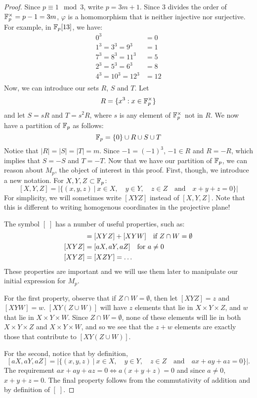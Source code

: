 \begin{proof}
Since $p \equiv 1 \mod{3}$, write $p = 3m + 1$.
Since 3 divides the order of $\mathbb{F}_{p}^{\times} = p-1 = 3m$, $\varphi$ is a homomorphism that is neither injective nor surjective.
For example, in $\mathbb{F}_p[13]$, we have:
\begin{align*}
	0^3 &= 0\\
	1^3 = 3^3 = 9^3 &= 1\\
	7^3 = 8^3 = 11^3 &= 5\\
	2^3 = 5^3 = 6^3 &= 8\\
	4^3 = 10^3 = 12^3 &= 12\\
\end{align*}
Now, we can introduce our sets $R$, $S$ and $T$.
Let
$$R=\{x^3:x\in \mathbb{F}_{p}^{\times}\}$$
and let $S = sR$ and $T = s^2R$, where $s$ is any element of $\mathbb{F}_{p}^{\times}$ not in $R$.
We now have a partition of $\mathbb{F}_p$ as follows:
$$\mathbb{F}_p = \{0\} \cup R \cup S \cup T$$
Notice that $|R| = |S| = |T| = m$.
Since $-1=(-1)^3$, $-1 \in R$ and $R = -R$, which implies that $S=-S$ and $T=-T$.
Now that we have our partition of $\mathbb{F}_p$, we can reason about $M_p$, the object of interest in this proof.
First, though, we introduce a new notation.
For $X,Y,Z \subset \mathbb{F}_p$:
$$[X,Y,Z] = |\{(x,y,z)\ |\ x\in X,\quad y\in Y,\quad z\in Z\quad \text{and} \quad x+y+z=0\}|$$
For simplicity, we will sometimes write $[XYZ]$ instead of $[X,Y,Z]$.
Note that this is different to writing homogenous coordinates in the projective plane!

The symbol $[\;]$ has a number of useful properties, such as:
\begin{align*}
	[XY(Z\cup W)] &= [XYZ] + [XYW]\quad \si Z\cap W = \emptyset\\
	[XYZ] &= [aX, aY, aZ]\quad \for a\neq0\\
	[XYZ] &= [XZY] = \ldots
\end{align*}
These properties are important and we will use them later to manipulate our initial expression for $M_p$.

For the first property, observe that if $Z\cap W = \emptyset$, then let $[XYZ] = z$ and $[XYW] = w$.
$[XY(Z\cup W)]$ will have $z$ elements that lie in $X\times Y \times Z$, and $w$ that lie in $X\times Y \times W$.
Since $Z\cap W = \emptyset$, none of these elements will lie in both $X\times Y \times Z$ and $X\times Y \times W$, and so we see that the $z+w$ elements are exactly those that contribute to $[XY(Z\cup W)]$.

For the second, notice that by definition,
$$[aX, aY, aZ] = |\{(x,y,z)\ |\ x\in X,\quad y\in Y,\quad z\in Z\quad \text{and} \quad ax+ay+az = 0\}|.$$
The requirement $ax+ay+az=0 \iff a(x+y+z) = 0$ and since $a\neq0$, $x+y+z = 0$.
The final property follows from the commutativity of addition and by definition of $[\;]$.


\end{proof}

